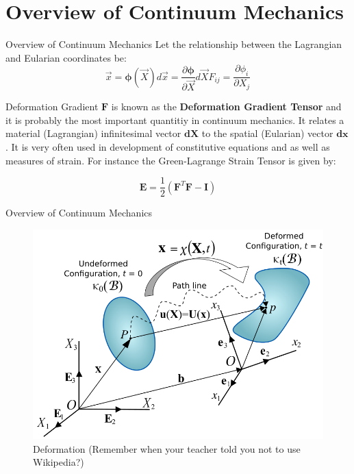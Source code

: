 \documentclass{beamer}
\begin{document}
\section{Overview of Continuum Mechanics}
\begin{frame}{Overview of Continuum Mechanics}
	Let the relationship between the Lagrangian and Eularian coordinates be:
	\begin{subequations}
		\begin{equation}\label{eq:phi}		
			\vec{x}=\boldsymbol{ \phi}(\vec{X})
		\end{equation}
		\begin{equation}
			d\vec{x}=\frac{\partial \boldsymbol{\phi}}{\partial\vec{X}}d\vec{X}
		\end{equation}
		\begin{equation}
			F_{ij}=\frac{\partial \phi_{i}}{\partial X_{j}}
		\end{equation}
	\end{subequations}
\begin{block}{Deformation Gradient}
$\mathbf{F}$ is known as the \textbf{Deformation Gradient Tensor} and it is probably the most important quantitiy in continuum mechanics. It relates a material (Lagrangian) infinitesimal vector $\mathbf{dX}$ to the spatial (Eularian) vector $\mathbf{dx}$. It is very often used in development of constitutive equations and as well as measures of strain. For instance the Green-Lagrange Strain Tensor is given by:
\end{block}
\begin{equation}
	\mathbf{E}=\frac{1}{2}(\mathbf{F}^{T}\mathbf{F}-\mathbf{I})
\end{equation}
\end{frame}
\begin{frame}{Overview of Continuum Mechanics}
	\begin{figure}
		\includegraphics[scale=0.25]{Deform}
		\caption{Deformation (Remember when your teacher told you not to use Wikipedia?)}
	\end{figure}
	
\end{frame}
\end{document}
